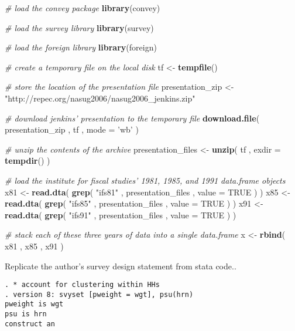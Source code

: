 \documentclass[]{book}
\newenvironment{Shaded}{\begin{snugshade}}{\end{snugshade}}
\newcommand{\KeywordTok}[1]{\textcolor[rgb]{0.13,0.29,0.53}{\textbf{{#1}}}}
\newcommand{\DataTypeTok}[1]{\textcolor[rgb]{0.13,0.29,0.53}{{#1}}}
\newcommand{\StringTok}[1]{\textcolor[rgb]{0.31,0.60,0.02}{{#1}}}
\newcommand{\CommentTok}[1]{\textcolor[rgb]{0.56,0.35,0.01}{\textit{{#1}}}}
\newcommand{\OtherTok}[1]{\textcolor[rgb]{0.56,0.35,0.01}{{#1}}}
\newcommand{\NormalTok}[1]{{#1}}
\begin{document}
\begin{Shaded}
\begin{Highlighting}[]
\CommentTok{# load the convey package}
\KeywordTok{library}\NormalTok{(convey)}

\CommentTok{# load the survey library}
\KeywordTok{library}\NormalTok{(survey)}

\CommentTok{# load the foreign library}
\KeywordTok{library}\NormalTok{(foreign)}

\CommentTok{# create a temporary file on the local disk}
\NormalTok{tf <-}\StringTok{ }\KeywordTok{tempfile}\NormalTok{()}

\CommentTok{# store the location of the presentation file}
\NormalTok{presentation_zip <-}\StringTok{ "http://repec.org/nasug2006/nasug2006_jenkins.zip"}

\CommentTok{# download jenkins' presentation to the temporary file}
\KeywordTok{download.file}\NormalTok{( presentation_zip , tf , }\DataTypeTok{mode =} \StringTok{'wb'} \NormalTok{)}

\CommentTok{# unzip the contents of the archive}
\NormalTok{presentation_files <-}\StringTok{ }\KeywordTok{unzip}\NormalTok{( tf , }\DataTypeTok{exdir =} \KeywordTok{tempdir}\NormalTok{() )}

\CommentTok{# load the institute for fiscal studies' 1981, 1985, and 1991 data.frame objects}
\NormalTok{x81 <-}\StringTok{ }\KeywordTok{read.dta}\NormalTok{( }\KeywordTok{grep}\NormalTok{( }\StringTok{"ifs81"} \NormalTok{, presentation_files , }\DataTypeTok{value =} \OtherTok{TRUE} \NormalTok{) )}
\NormalTok{x85 <-}\StringTok{ }\KeywordTok{read.dta}\NormalTok{( }\KeywordTok{grep}\NormalTok{( }\StringTok{"ifs85"} \NormalTok{, presentation_files , }\DataTypeTok{value =} \OtherTok{TRUE} \NormalTok{) )}
\NormalTok{x91 <-}\StringTok{ }\KeywordTok{read.dta}\NormalTok{( }\KeywordTok{grep}\NormalTok{( }\StringTok{"ifs91"} \NormalTok{, presentation_files , }\DataTypeTok{value =} \OtherTok{TRUE} \NormalTok{) )}

\CommentTok{# stack each of these three years of data into a single data.frame}
\NormalTok{x <-}\StringTok{ }\KeywordTok{rbind}\NormalTok{( x81 , x85 , x91 )}
\end{Highlighting}
\end{Shaded}

Replicate the author's survey design statement from stata code..

\begin{verbatim}
. * account for clustering within HHs 
. version 8: svyset [pweight = wgt], psu(hrn)
pweight is wgt
psu is hrn
construct an
\end{verbatim}
\end{document}
